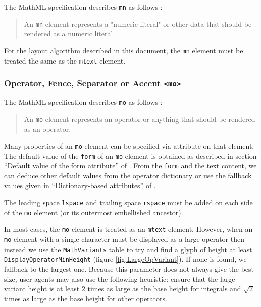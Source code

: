 The MathML specification describes {\tt mn} as follows \cite{MathML3}:
%
\begin{quote}
  An {\tt mn} element represents a "numeric literal" or other data that should
  be rendered as a numeric literal.
\end{quote}

For the layout algorithm described in this document, the
{\tt mn} element must be treated the same as the {\tt mtext} element.

\subsubsection{Operator, Fence, Separator or Accent {\tt <mo>}}\label{Operators}

The MathML specification describes {\tt mo} as follows \cite{MathML3}:
%
\begin{quote}
  An {\tt mo} element represents an operator or anything that should be
  rendered as an operator.
\end{quote}

Many properties of an {\tt mo} element can be specified via attribute on
that element. The default value of the {\tt form} of an {\tt mo} element is
obtained as described in section ``Default value of the form attribute'' of
\cite{MathML3}. From the {\tt form} and the text content, we can deduce other
default values from the operator dictionary or use the fallback values given
in ``Dictionary-based attributes'' of \cite{MathML3}.

The leading space {\tt lspace} and trailing space {\tt rspace} must be added on
each side of the {\tt mo} element (or its outermost embellished ancestor).

In most cases, the {\tt mo} element is treated as an {\tt mtext} element.
However, when an {\tt mo} element with a single character must be displayed as
a large operator then instead we use the {\tt MathVariants}
table to try and find a glyph of height at least
{\tt DisplayOperatorMinHeight}
(figure \ref{fig:LargeOpVariant}). If none is found, we fallback to the
largest one. Because this parameter does not always give
the best size, user agents may also use the following heuristic: ensure
that the large variant height is at least $2$ times as large as the base height
for integrals and $\sqrt{2}$ times as large as the base height for other
operators.

